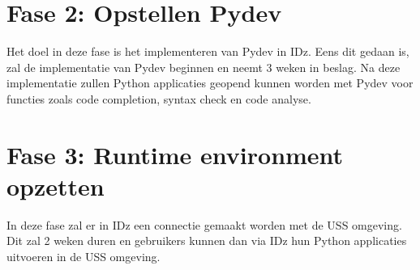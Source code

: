 \section{Fase 2: Opstellen Pydev}
\label{sec:m-opstellen-pydev}
Het doel in deze fase is het implementeren van Pydev in IDz. Eens dit gedaan is, zal de implementatie van Pydev beginnen en neemt 3 weken in beslag. Na deze implementatie zullen Python applicaties geopend kunnen worden met Pydev voor functies zoals code completion, syntax check en code analyse. 


\section{Fase 3: Runtime environment opzetten}
\label{sec:m-python-interpreter-opzetten}
In deze fase zal er in IDz een connectie gemaakt worden met de USS omgeving. Dit zal 2 weken duren en gebruikers kunnen dan via IDz hun Python applicaties uitvoeren in de USS omgeving.
%    


